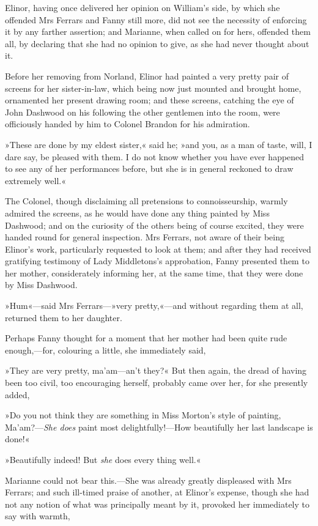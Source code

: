 Elinor, having once delivered her opinion on William’s side, by which she offended Mrs Ferrars and Fanny still more, did not see the necessity of enforcing it by any farther assertion; and Marianne, when called on for hers, offended them all, by declaring that she had no opinion to give, as she had never thought about it.

Before her removing from Norland, Elinor had painted a very pretty pair of screens for her sister-in-law, which being now just mounted and brought home, ornamented her present drawing room; and these screens, catching the eye of John Dashwood on his following the other gentlemen into the room, were officiously handed by him to Colonel Brandon for his admiration.

»These are done by my eldest sister,« said he; »and you, as a man of taste, will, I dare say, be pleased with them. I do not know whether you have ever happened to see any of her performances before, but she is in general reckoned to draw extremely well.«

The Colonel, though disclaiming all pretensions to connoisseurship, warmly admired the screens, as he would have done any thing painted by Miss Dashwood; and on the curiosity of the others being of course excited, they were handed round for general inspection. Mrs Ferrars, not aware of their being Elinor’s work, particularly requested to look at them; and after they had received gratifying testimony of Lady Middletons’s approbation, Fanny presented them to her mother, considerately informing her, at the same time, that they were done by Miss Dashwood.

»Hum«—said Mrs Ferrars—»very pretty,«—and without regarding them at all, returned them to her daughter.

Perhaps Fanny thought for a moment that her mother had been quite rude enough,—for, colouring a little, she immediately said,

»They are very pretty, ma’am—an’t they?« But then again, the dread of having been too civil, too encouraging herself, probably came over her, for she presently added,

»Do you not think they are something in Miss Morton’s style of painting, Ma’am?—\textit{She does} paint most delightfully!—How beautifully her last landscape is done!«

»Beautifully indeed! But \textit{she} does every thing well.«

Marianne could not bear this.—She was already greatly displeased with Mrs Ferrars; and such ill-timed praise of another, at Elinor’s expense, though she had not any notion of what was principally meant by it, provoked her immediately to say with warmth,

